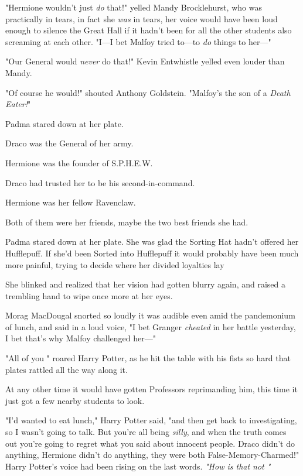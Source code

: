 "Hermione wouldn't just \emph{do} that!" yelled Mandy Brocklehurst, who was
practically in tears, in fact she \emph{was} in tears, her voice would have
been loud enough to silence the Great Hall if it hadn't been for all the other
students also screaming at each other. "I---I bet Malfoy tried to---to
\emph{do} things to her\mbox{---}"

"Our General would \emph{never} do that!" Kevin Entwhistle yelled even louder
than Mandy.

"Of course he would!" shouted Anthony Goldstein. "Malfoy's the son of a
\emph{Death Eater!}"

Padma stared down at her plate.

Draco was the General of her army.

Hermione was the founder of S.P.H.E.W.

Draco had trusted her to be his second-in-command.

Hermione was her fellow Ravenclaw.

Both of them were her friends, maybe the two best friends she had.

Padma stared down at her plate. She was glad the Sorting Hat hadn't offered her
Hufflepuff. If she'd been Sorted into Hufflepuff it would probably have been
much more painful, trying to decide where her divided loyalties lay{\el}

She blinked and realized that her vision had gotten blurry again, and raised a
trembling hand to wipe once more at her eyes.

Morag MacDougal snorted so loudly it was audible even amid the pandemonium of
lunch, and said in a loud voice, "I bet Granger \emph{cheated} in her battle
yesterday, I bet that's why Malfoy challenged her\mbox{---}"

"All of you \emph{}" roared Harry Potter, as he hit the table with his
fists so hard that plates rattled all the way along it.

At any other time it would have gotten Professors reprimanding him, this time
it just got a few nearby students to look.

"I'd wanted to eat lunch," Harry Potter said, "and then get back to
investigating, so I wasn't going to talk. But you're all being \emph{silly},
and when the truth comes out you're going to regret what you said about
innocent people. Draco didn't do anything, Hermione didn't do anything, they
were both False-Memory-Charmed!" Harry Potter's voice had been rising on the
last words. \emph{"How is that not "}

